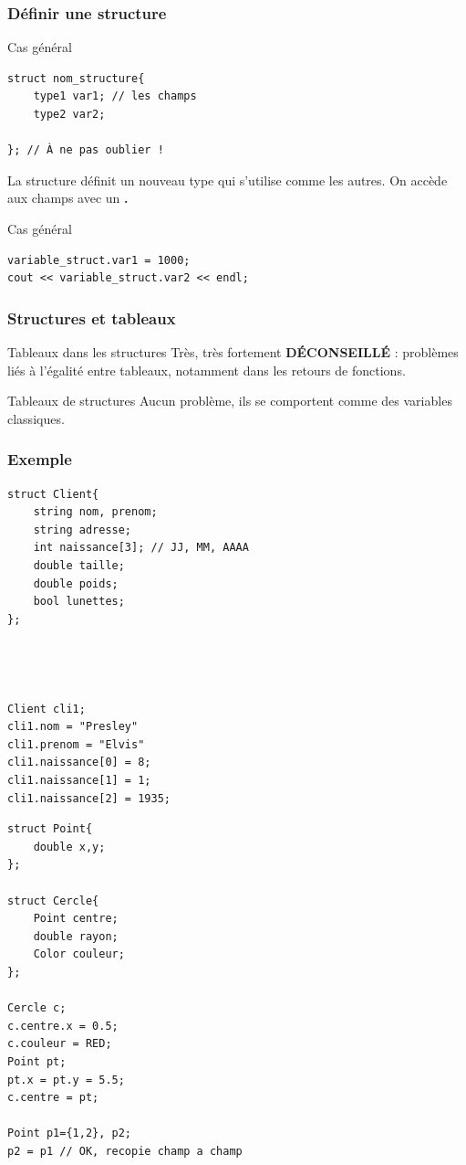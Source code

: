\begin{frame}[fragile=singleslide]
	\frametitle{Définir une structure}
	
	\begin{block}{Cas général}
		\begin{verbatim}
struct nom_structure{
	type1 var1; // les champs
	type2 var2;

}; // À ne pas oublier !
        \end{verbatim}
	\end{block}
	
	La structure définit un nouveau type qui s'utilise comme les autres.
	On accède aux champs avec un \textbf{\huge .}
	
	\begin{block}{Cas général}
	\begin{verbatim}
variable_struct.var1 = 1000;
cout << variable_struct.var2 << endl;
    \end{verbatim}
	\end{block}
\end{frame}

\begin{frame}
	\frametitle{Structures et tableaux}
	\begin{alertblock}{Tableaux dans les structures}
		Très, très fortement \textbf{DÉCONSEILLÉ} : problèmes liés à l'égalité entre tableaux, notamment dans les retours de fonctions.
	\end{alertblock}
	
	\begin{block}{Tableaux de structures}
		Aucun problème, ils se comportent comme des variables classiques.
	\end{block}
\end{frame}

\begin{frame}[fragile=singleslide]
	\frametitle{Exemple}
	\begin{minipage}{0.47\linewidth}
		\begin{verbatim}
struct Client{
    string nom, prenom;
    string adresse;
    int naissance[3]; // JJ, MM, AAAA
    double taille; 
    double poids;
    bool lunettes;
};




Client cli1;
cli1.nom = "Presley"
cli1.prenom = "Elvis"
cli1.naissance[0] = 8;
cli1.naissance[1] = 1;
cli1.naissance[2] = 1935;

		\end{verbatim}
	\end{minipage}
	\hfill
	\begin{minipage}{0.47\linewidth}
		\begin{verbatim}
struct Point{
	double x,y;
};

struct Cercle{
    Point centre;
    double rayon;
    Color couleur;
};

Cercle c;
c.centre.x = 0.5;
c.couleur = RED;
Point pt;
pt.x = pt.y = 5.5;
c.centre = pt;

Point p1={1,2}, p2;
p2 = p1 // OK, recopie champ a champ
		\end{verbatim}
	\end{minipage}
\end{frame}

